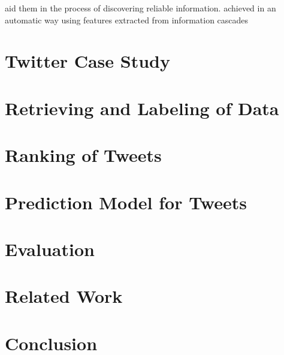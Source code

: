 \documentclass{proseminar}
\begin{document}
aid them in the process of discovering reliable information.  achieved in an automatic way using features
extracted from information cascades

\section{Twitter Case Study}


\section{Retrieving and Labeling of Data}


\section{Ranking of Tweets}

\section{Prediction Model for Tweets}

\section{Evaluation}

\section{Related Work}

\section{Conclusion}




  

\balancecolumns
\end{document}
